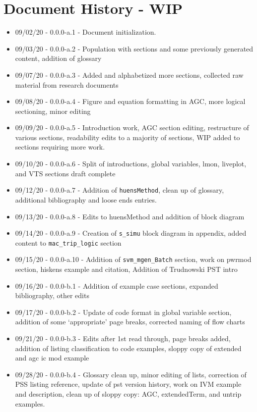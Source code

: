 \chapter{Document History  - WIP}

\begin{itemize}
\itemsep 0em
\item 09/02/20 - 0.0.0-a.1 - Document initialization.
\item 09/03/20 - 0.0.0-a.2 - Population with sections and some previously generated content, addition of glossary
\item 09/07/20 - 0.0.0-a.3 - Added and alphabetized more sections, collected raw material from research documents
\item 09/08/20 - 0.0.0-a.4 - Figure and equation formatting in AGC, more logical sectioning, minor editing
\item 09/09/20 - 0.0.0-a.5 - Introduction work, AGC section editing, restructure of various sections, readability edits to a majority of sections, WIP added to sections requiring more work.
\item 09/10/20 - 0.0.0-a.6 - Split of introductions, global variables, lmon, liveplot, and VTS sections draft complete
\item 09/12/20 - 0.0.0-a.7 - Addition of \verb|huensMethod|, clean up of glossary, additional bibliography and loose ends entries.
\item 09/13/20 - 0.0.0-a.8 - Edits to huensMethod and addition of block diagram 
\item 09/14/20 - 0.0.0-a.9 - Creation of \verb|s_simu| block diagram in appendix, added content to \verb|mac_trip_logic| section
\item 09/15/20 - 0.0.0-a.10 - Addition of \verb|svm_mgen_Batch| section, work on pwrmod section, hiskens example and citation, Addition of Trudnowski PST intro
\item 09/16/20 - 0.0.0-b.1 - Addition of example case sections, expanded bibliography, other edits 
\item 09/17/20 - 0.0.0-b.2 - Update of code format in global variable section, addition of some `appropriate' page breaks, corrected naming of flow charts
\item 09/21/20 - 0.0.0-b.3 - Edits after 1st read through, page breaks added, addition of listing classification to code examples, sloppy copy of extended and agc ic mod example
\item 09/28/20 - 0.0.0-b.4 - Glossary clean up, minor editing of lists, correction of PSS listing reference, update of pst version history, work on IVM example and description, clean up of sloppy copy: AGC, extendedTerm, and untrip examples.
\end{itemize}